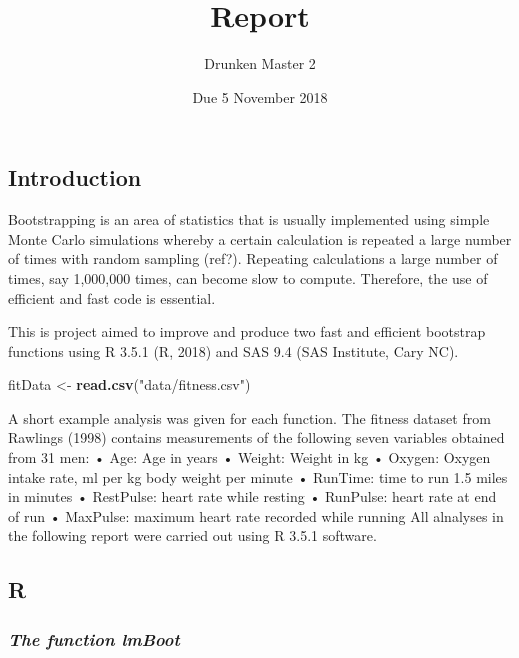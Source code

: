 \documentclass[]{article}
\title{Report}
\author{Drunken Master 2}
\date{Due 5 November 2018}
\newenvironment{Shaded}{\begin{snugshade}}{\end{snugshade}}
\newcommand{\KeywordTok}[1]{\textcolor[rgb]{0.13,0.29,0.53}{\textbf{#1}}}
\newcommand{\StringTok}[1]{\textcolor[rgb]{0.31,0.60,0.02}{#1}}
\newcommand{\NormalTok}[1]{#1}
\begin{document}
\maketitle

{
\setcounter{tocdepth}{3}
\tableofcontents
}
\subsection{Introduction}\label{introduction}

Bootstrapping is an area of statistics that is usually implemented using
simple Monte Carlo simulations whereby a certain calculation is repeated
a large number of times with random sampling (ref?). Repeating
calculations a large number of times, say 1,000,000 times, can become
slow to compute. Therefore, the use of efficient and fast code is
essential.

This is project aimed to improve and produce two fast and efficient
bootstrap functions using R 3.5.1 (R, 2018) and SAS 9.4 (SAS Institute,
Cary NC).

\begin{Shaded}
\begin{Highlighting}[]
\NormalTok{fitData <-}\StringTok{ }\KeywordTok{read.csv}\NormalTok{(}\StringTok{"data/fitness.csv"}\NormalTok{)}
\end{Highlighting}
\end{Shaded}

A short example analysis was given for each function. The fitness
dataset from Rawlings (1998) contains measurements of the following
seven variables obtained from 31 men: • Age: Age in years • Weight:
Weight in kg • Oxygen: Oxygen intake rate, ml per kg body weight per
minute • RunTime: time to run 1.5 miles in minutes • RestPulse: heart
rate while resting • RunPulse: heart rate at end of run • MaxPulse:
maximum heart rate recorded while running All alnalyses in the following
report were carried out using R 3.5.1 software.

\pagebreak

\subsection{R}\label{r}

\subsubsection{\texorpdfstring{\emph{The function
lmBoot}}{The function lmBoot}}\label{the-function-lmboot}
\end{document}
